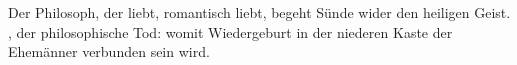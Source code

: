 Der Philosoph, der liebt, romantisch liebt, begeht  Sünde wider den heiligen Geist. \textit{ }, der philosophische Tod: womit Wiedergeburt in der niederen Kaste der Ehemänner verbunden sein wird.
\par

